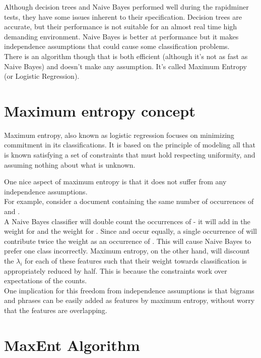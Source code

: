 Although decision trees and Naive Bayes performed well during the rapidminer tests, they have some issues inherent to their specification. Decision trees are accurate, but their performance is 
not suitable for an almost real time high demanding environment. Naive Bayes is better at performance but it makes independence assumptions that could cause some classification problems.\\
There is an algorithm though that is both efficient (although it's not as fast as Naive Bayes) and doesn't make any assumption. It's called Maximum Entropy (or Logistic Regression).

\section{Maximum entropy concept}
Maximum entropy, also known as logistic regression focuses on minimizing commitment in its classifications. It is based on the principle of modeling all that is known satisfying a set of constraints
that must hold respecting uniformity, and assuming nothing about what is unknown.

One nice aspect of maximum entropy is that it does not suffer from any independence assumptions.\\
For example, consider a document containing the same number of occurrences of  and .\\
A Naive Bayes classifier will double count the occurrences of  
- it will add in the weight for  and the weight for . Since  and
 occur equally, a single occurrence of  will contribute twice the weight as an occurrence of . This will cause Naive Bayes to prefer one class 
incorrectly.
Maximum entropy, on the other hand, will discount the $\lambda_i$ for each of these features such that their weight towards classification is appropriately reduced by half.
This is because the constraints work over expectations of the counts. \\
One implication for this freedom from independence assumptions is that bigrams and phrases can be easily added as features by maximum entropy, without worry that the features are overlapping.


\section{MaxEnt Algorithm}


